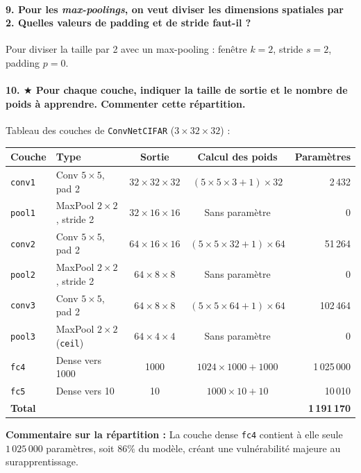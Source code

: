 \documentclass{report}
\begin{document}
\paragraph{9. Pour les \textit{max-poolings}, on veut diviser les dimensions spatiales par 2. Quelles valeurs de padding et de stride faut-il ?}
 Pour diviser la taille par 2 avec un max-pooling : fenêtre $k = 2$, stride $s = 2$, padding $p = 0$.

\paragraph{10. $\bigstar$ Pour chaque couche, indiquer la taille de sortie et le nombre de poids à apprendre. Commenter cette répartition.}
 Tableau des couches de \texttt{ConvNetCIFAR} ($3 \times 32 \times 32$) :
\begin{table}[H]
\centering
\small
\begin{tabular}{llccr}
\toprule
\textbf{Couche} & \textbf{Type} & \textbf{Sortie} & \textbf{Calcul des poids} & \textbf{Paramètres} \\
\midrule
\texttt{conv1} & Conv $5 \times 5$, pad 2 & $32 \times 32 \times 32$ & $(5 \times 5 \times 3 + 1) \times 32$ & 2\,432 \\
\texttt{pool1} & MaxPool $2 \times 2$, stride 2 & $32 \times 16 \times 16$ & Sans paramètre & 0 \\
\texttt{conv2} & Conv $5 \times 5$, pad 2 & $64 \times 16 \times 16$ & $(5 \times 5 \times 32 + 1) \times 64$ & 51\,264 \\
\texttt{pool2} & MaxPool $2 \times 2$, stride 2 & $64 \times 8 \times 8$ & Sans paramètre & 0 \\
\texttt{conv3} & Conv $5 \times 5$, pad 2 & $64 \times 8 \times 8$ & $(5 \times 5 \times 64 + 1) \times 64$ & 102\,464 \\
\texttt{pool3} & MaxPool $2 \times 2$ (\texttt{ceil}) & $64 \times 4 \times 4$ & Sans paramètre & 0 \\
\texttt{fc4}   & Dense vers 1000 & 1000 & $1024 \times 1000 + 1000$ & 1\,025\,000 \\
\texttt{fc5}   & Dense vers 10 & 10 & $1000 \times 10 + 10$ & 10\,010 \\
\midrule
\textbf{Total} & & & & \textbf{1\,191\,170} \\
\bottomrule
\end{tabular}
\end{table}

\textbf{Commentaire sur la répartition :} La couche dense \texttt{fc4} contient à elle seule $1\,025\,000$ paramètres, soit \textbf{$86\%$} du modèle, créant une vulnérabilité majeure au surapprentissage.
\end{document}
